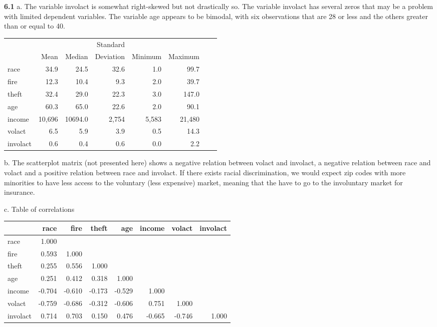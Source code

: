 \textbf{6.1} a. The variable involact is somewhat right-skewed but
not drastically so. The variable involact has several zeros that may
be a problem with limited dependent variables. The variable age
appears to be bimodal, with six observations that are 28 or less and
the others greater than or equal to 40.
\begin{center}\begin{tabular}{lrrrrrrr}
   \hline
       &   &  & Standard \\
       &  Mean  &  Median & Deviation & Minimum & Maximum\\
   \hline
race   &   34.9    &   24.5 &  32.6  &      1.0  &     99.7\\
fire   &   12.3    &   10.4 &   9.3  &      2.0  &     39.7\\
theft  &   32.4    &   29.0 &  22.3  &      3.0  &    147.0\\
age    &   60.3    &   65.0 &  22.6  &      2.0  &     90.1\\
income &   10,696  &  10694.0 & 2,754  &    5,583 &   21,480\\
volact  &  6.5    &    5.9  &  3.9     &   0.5    &   14.3\\
involact & 0.6   &     0.4  &  0.6     &   0.0    &    2.2\\
   \hline
   \end{tabular}\end{center}
b. The scatterplot matrix (not presented here) shows a negative
relation between volact and involact, a negative relation between
race and volact and a positive relation between race and involact.
If there exists racial discrimination, we would expect zip codes
with more minorities to have less access to the voluntary (less
expensive) market, meaning that the have to go to the involuntary
market for insurance.

c. Table of correlations
\begin{center}\begin{tabular}{lrrrrrrr}
   \hline
       &    race &  fire  &theft &   age & income &volact &involact\\
   \hline
race   &   1.000 &   & &  &  &  &\\
fire   &   0.593 & 1.000  & & &  &  &\\
theft  &   0.255 & 0.556  &1.000 &  &  &  &\\
age    &   0.251 & 0.412  &0.318 & 1.000 &  &  &\\
income &  -0.704 &-0.610 &-0.173 &-0.529 & 1.000  &  &\\
volact &  -0.759 &-0.686 &-0.312 &-0.606 & 0.751  &1.000   &\\
involact & 0.714 & 0.703 & 0.150 & 0.476 & -0.665 &-0.746  &  1.000\\
   \hline
   \end{tabular}\end{center}

